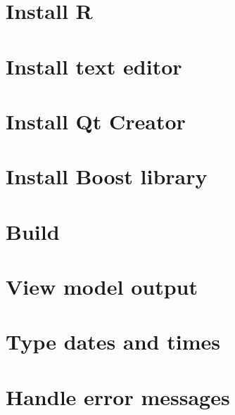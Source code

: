 \documentclass [a4paper, 11pt, openany]  {memoir}
\begin{document}
\chapter{Install R}

\chapter{Install text editor}

\chapter{Install Qt Creator}

\chapter{Install Boost library}

\chapter{Build \protect\US}

\chapter{View model output}

\chapter{Type dates and times}

\chapter{Handle error messages}



\end{document}
